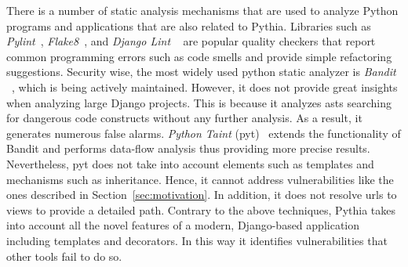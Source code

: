 There is a number of static analysis
mechanisms that are used to analyze Python
programs and applications that are
also related to Pythia.
Libraries such as
{\it Pylint}~\cite{pylint},
{\it Flake8}~\cite{py_flake},
and {\it Django Lint} ~\cite{django_lint}
are popular quality checkers that report
common programming errors such as code
smells and provide simple refactoring
suggestions.
Security wise,
the most widely used
python static analyzer is
{\it Bandit} ~\cite{bandit},
which is being actively maintained.
However,
it does not provide great insights
when analyzing large Django projects.
This is because it analyzes {\sc ast}s 
searching for dangerous code
constructs without any further analysis.
As a result,
it generates numerous false alarms.
{\it Python Taint}
({\sc pyt})~\cite{pyt} extends the
functionality of Bandit and performs
data-flow analysis thus providing more
precise results.
Nevertheless,
{\sc pyt} does not take into account
elements such as templates and
mechanisms such as inheritance.
Hence,
it cannot address vulnerabilities
like the ones described in
Section~\ref{sec:motivation}.
In addition,
it does not resolve {\sc url}s
to views to provide a detailed path.
Contrary to the above techniques,
Pythia takes into account all the
novel features of a modern,
Django-based application including
templates and decorators.
In this way it identifies vulnerabilities
that other tools fail to do so.
